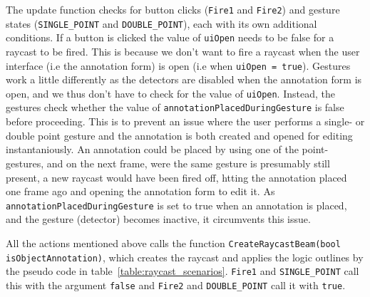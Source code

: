 The update function checks for button clicks (\texttt{Fire1} and \texttt{Fire2}) and gesture states (\texttt{SINGLE\_POINT} and \texttt{DOUBLE\_POINT}), 
each with its own additional conditions.
If a button is clicked the value of \texttt{uiOpen} needs to be false for a raycast to be fired. 
This is because we don't want to fire a raycast when the user interface (i.e the annotation form) is 
open (i.e when \texttt{uiOpen = true}). Gestures work a little differently as the detectors are disabled when the annotation form is open, and we thus don't have to check 
for the value of \texttt{uiOpen}.
Instead, the gestures check whether the value of \texttt{annotation\-Placed\-During\-Gesture} is false before proceeding. This is to prevent an issue where the user performs a 
single- or double point gesture and the annotation is both created and opened for editing instantaniously. An annotation could be placed by 
using one of the point-gestures, and on the next frame, were the same gesture is presumably still present, a new raycast would have been fired off, htting the annotation placed 
one frame ago and opening the annotation form to edit it. As \texttt{annotation\-Placed\-During\-Gesture} is set to true when an annotation is placed, and the gesture (detector) 
becomes inactive, it circumvents this issue.

All the actions mentioned above calls the function \texttt{Create\-Raycast\-Beam(\-bool isObject\-Annotation)}, which creates the raycast and applies the logic outlines by the 
pseudo code in table~\vref{table:raycast_scenarios}. 
\texttt{Fire1} and \texttt{SINGLE\_POINT} call this with the argument \texttt{false} and \texttt{Fire2} and \texttt{DOUBLE\_POINT} call it with \texttt{true}.

